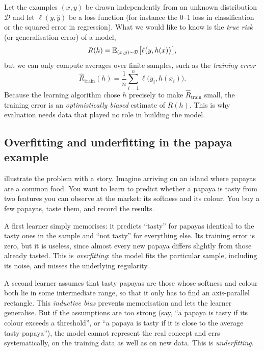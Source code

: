 Let the examples $(x,y)$ be drawn independently from an unknown distribution $\mathcal D$ and
let $\ell(y,\hat y)$ be a loss function (for instance the 0--1 loss in classification or the
squared error in regression). What we would like to know is the \emph{true risk} (or
generalisation error) of a model,
\begin{equation}
  R(h)=\mathbb{E}_{(x,y)\sim\mathcal D}\bigl[\ell\bigl(y,h(x)\bigr)\bigr],
\end{equation}
but we can only compute averages over finite samples, such as the \emph{training error}
\begin{equation}
  \widehat R_{\text{train}}(h)=\frac1n\sum_{i=1}^n \ell\bigl(y_i,h(x_i)\bigr).
\end{equation}
Because the learning algorithm chose $h$ precisely to make $\widehat R_{\text{train}}$ small,
the training error is an \emph{optimistically biased} estimate of $R(h)$. This is why evaluation needs data that played no role in building the model.

\subsection{Overfitting and underfitting in the papaya example}

\citet{shalev2014understanding} illustrate the problem with a story. Imagine arriving on an
island where papayas are a common food. You want to learn to predict whether a papaya is
tasty from two features you can observe at the market: its softness and its colour. You buy
a few papayas, taste them, and record the results.

A first learner simply memorises: it predicts ``tasty'' for papayas identical to the tasty
ones in the sample and ``not tasty'' for everything else. Its training error is zero, but it
is useless, since almost every new papaya differs slightly from those already tasted. This
is \emph{overfitting}: the model fits the particular sample, including its noise, and misses
the underlying regularity.

A second learner assumes that tasty papayas are those whose softness and colour both lie in
some intermediate range, so that it only has to find an axis-parallel rectangle. This
\emph{inductive bias} prevents memorisation and lets the learner generalise. But if the
assumptions are too strong (say, ``a papaya is tasty if its colour exceeds a threshold'', or
``a papaya is tasty if it is close to the average tasty papaya''), the model cannot
represent the real concept and errs systematically, on the training data as well as on new
data. This is \emph{underfitting}.


